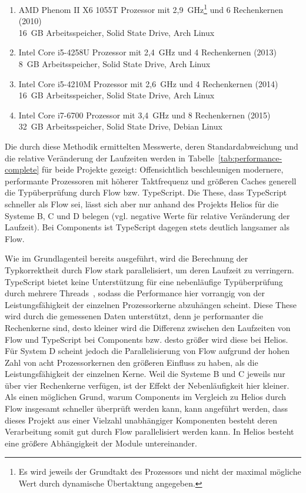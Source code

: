 \enlargethispage{\baselineskip}
\begin{enumerate}[label=\Alph*.]
  \item AMD Phenom II X6 1055T Prozessor mit 2,9~GHz\footnote{Es wird jeweils der Grundtakt des Prozessors und nicht der maximal mögliche Wert durch dynamische Übertaktung angegeben.} und 6 Rechenkernen (2010)\\16~GB Arbeitsspeicher, Solid State Drive, Arch Linux
  \item Intel Core i5-4258U Prozessor mit 2,4~GHz und 4 Rechenkernen (2013)\\8~GB Arbeitsspeicher, Solid State Drive, Arch Linux
  \item Intel Core i5-4210M Prozessor mit 2,6~GHz und 4 Rechenkernen (2014)\\16~GB Arbeitsspeicher, Solid State Drive, Arch Linux
  \item Intel Core i7-6700 Prozessor mit 3,4~GHz und 8 Rechenkernen (2015)\\32~GB Arbeitsspeicher, Solid State Drive, Debian Linux
\end{enumerate}

Die durch diese Methodik ermittelten Messwerte, deren Standardabweichung und die relative Veränderung der Laufzeiten werden in Tabelle~\ref{tab:performance-complete} für beide Projekte gezeigt: Offensichtlich beschleunigen modernere, performante Prozessoren mit höherer Taktfrequenz und größeren Caches generell die Typüberprüfung durch Flow bzw. TypeScript. Die These, dass TypeScript schneller als Flow sei, lässt sich aber nur anhand des Projekts Helios für die Systeme B, C und D belegen (vgl. negative Werte für relative Veränderung der Laufzeit). Bei Components ist TypeScript dagegen stets deutlich langsamer als Flow.

\tablespace


Wie im Grundlagenteil bereits ausgeführt, wird die Berechnung der Typkorrektheit durch Flow stark parallelisiert, um deren Laufzeit zu verringern. TypeScript bietet keine Unterstützung für eine nebenläufige Typüberprüfung durch mehrere Threads~\autocite{TS:NO_MULTICORE}, sodass die Performance hier vorrangig von der Leistungsfähigkeit der einzelnen Prozessorkerne abzuhängen scheint. Diese These wird durch die gemessenen Daten unterstützt, denn je performanter die Rechenkerne sind, desto kleiner wird die Differenz zwischen den Laufzeiten von Flow und TypeScript bei Components bzw. desto größer wird diese bei Helios.
Für System D scheint jedoch die Parallelisierung von Flow aufgrund der hohen Zahl von acht Prozessorkernen den größeren Einfluss zu haben, als die Leistungsfähigkeit der einzelnen Kerne. Weil die Systeme B und C jeweils nur über vier Rechenkerne verfügen, ist der Effekt der Nebenläufigkeit hier kleiner. Als einen möglichen Grund, warum Components im Vergleich zu Helios durch Flow insgesamt schneller überprüft werden kann, kann angeführt werden, dass dieses Projekt aus einer Vielzahl unabhängiger Komponenten besteht deren Verarbeitung somit gut durch Flow parallelisiert werden kann. In Helios besteht eine größere Abhängigkeit der Module untereinander.

